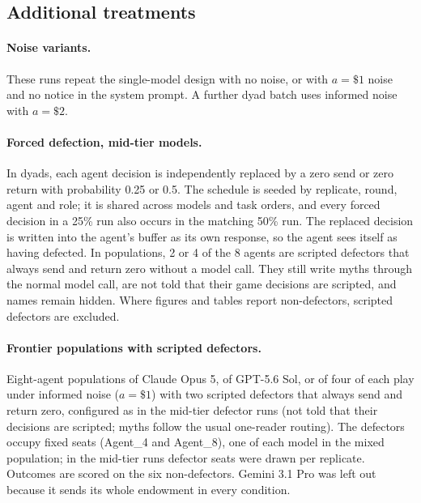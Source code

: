 \subsection{Additional treatments}
\label{sec:protocol-treatments}

\paragraph{Noise variants.} These runs repeat the single-model design with no noise, or with $a=\$1$ noise and no notice in the system prompt. A further dyad batch uses informed noise with $a=\$2$.

\paragraph{Forced defection, mid-tier models.} In dyads, each agent decision is independently replaced by a zero send or zero return with probability 0.25 or 0.5. The schedule is seeded by replicate, round, agent and role; it is shared across models and task orders, and every forced decision in a 25\% run also occurs in the matching 50\% run. The replaced decision is written into the agent's buffer as its own response, so the agent sees itself as having defected. In populations, 2 or 4 of the 8 agents are scripted defectors that always send and return zero without a model call. They still write myths through the normal model call, are not told that their game decisions are scripted, and names remain hidden. Where figures and tables report non-defectors, scripted defectors are excluded.

\paragraph{Frontier populations with scripted defectors.} Eight-agent populations of Claude Opus 5, of GPT-5.6 Sol, or of four of each play under informed noise ($a=\$1$) with two scripted defectors that always send and return zero, configured as in the mid-tier defector runs (not told that their decisions are scripted; myths follow the usual one-reader routing). The defectors occupy fixed seats (Agent\_4 and Agent\_8), one of each model in the mixed population; in the mid-tier runs defector seats were drawn per replicate. Outcomes are scored on the six non-defectors. Gemini 3.1 Pro was left out because it sends its whole endowment in every condition.

